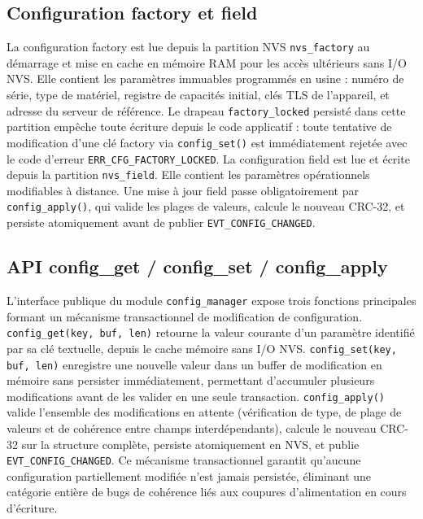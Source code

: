 \subsection{Configuration factory et field}
\label{subsec:config_ff}

La configuration factory est lue depuis la partition NVS
\texttt{nvs\_factory} au démarrage et mise en cache en mémoire RAM
pour les accès ultérieurs sans I/O NVS. Elle contient les paramètres
immuables programmés en usine : numéro de série, type de matériel,
registre de capacités initial, clés TLS de l'appareil, et adresse
du serveur de référence. Le drapeau \texttt{factory\_locked} persisté
dans cette partition empêche toute écriture depuis le code applicatif :
toute tentative de modification d'une clé factory via
\texttt{config\_set()} est immédiatement rejetée avec le code
d'erreur \texttt{ERR\_CFG\_FACTORY\_LOCKED}. La configuration field
est lue et écrite depuis la partition \texttt{nvs\_field}. Elle
contient les paramètres opérationnels modifiables à distance.
Une mise à jour field passe obligatoirement par \texttt{config\_apply()},
qui valide les plages de valeurs, calcule le nouveau CRC-32, et
persiste atomiquement avant de publier \texttt{EVT\_CONFIG\_CHANGED}.

\subsection{API config\_get / config\_set / config\_apply}
\label{subsec:config_api}

L'interface publique du module \texttt{config\_manager} expose trois
fonctions principales formant un mécanisme transactionnel de modification
de configuration. \texttt{config\_get(key, buf, len)} retourne la
valeur courante d'un paramètre identifié par sa clé textuelle, depuis
le cache mémoire sans I/O NVS. \texttt{config\_set(key, buf, len)}
enregistre une nouvelle valeur dans un buffer de modification en mémoire
sans persister immédiatement, permettant d'accumuler plusieurs
modifications avant de les valider en une seule transaction.
\texttt{config\_apply()} valide l'ensemble des modifications en attente
(vérification de type, de plage de valeurs et de cohérence entre
champs interdépendants), calcule le nouveau CRC-32 sur la structure
complète, persiste atomiquement en NVS, et publie
\texttt{EVT\_CONFIG\_CHANGED}. Ce mécanisme transactionnel garantit
qu'aucune configuration partiellement modifiée n'est jamais persistée,
éliminant une catégorie entière de bugs de cohérence liés aux coupures
d'alimentation en cours d'écriture.

